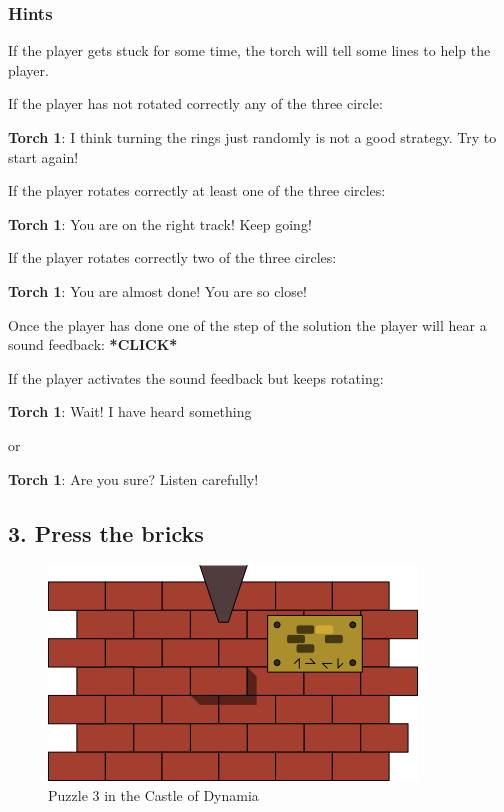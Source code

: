\subsubsection*{Hints}
If the player gets stuck for some time, the torch will tell some lines to help the player.

If the player has not rotated correctly any of the three circle:

\textbf{Torch 1}: I think turning the rings just randomly is not a good strategy. Try to start again!

If the player rotates correctly at least one of the three circles:

\textbf{Torch 1}: You are on the right track! Keep going!

If the player rotates correctly two of the three circles:

\textbf{Torch 1}: You are almost done! You are so close!

Once the player has done one of the step of the solution the player will hear a sound feedback: \textbf{*CLICK*}

If the player activates the sound feedback but keeps rotating:

\textbf{Torch 1}: Wait! I have heard something

or

\textbf{Torch 1}: Are you sure? Listen carefully!

\subsection{3. Press the bricks}

\begin{figure}[H]
  \centering
  \includegraphics[width=\textwidth]{Images/Puzzles/castleOfDynamia3}
  \caption{Puzzle 3 in the Castle of Dynamia}
\end{figure}

